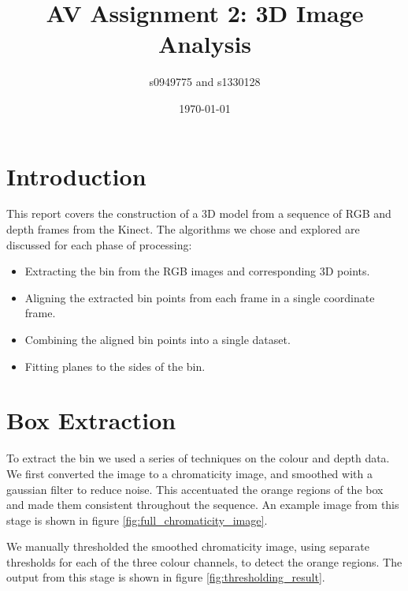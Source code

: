\documentclass[12pt,a4paper,onecolumn]{article}
\begin{document}
\title{AV Assignment 2: 3D Image Analysis}
\author{s0949775 and s1330128}
\date{\today}
\maketitle


\section{Introduction}
This report covers the construction of a 3D model from a 
sequence of RGB and depth frames from the Kinect. 
The algorithms we chose and explored are discussed for
each phase of processing:
\begin{itemize}
\item Extracting the bin from the RGB images and corresponding 3D points.
\item Aligning the extracted bin points from each frame in a single coordinate frame.
\item Combining the aligned bin points into a single dataset.
\item Fitting planes to the sides of the bin.
\end{itemize}

\section{Box Extraction}
To extract the bin we used a series of techniques on the colour and depth data.  We first converted the image to a chromaticity image, and smoothed with a gaussian filter to reduce noise.  This accentuated the orange regions of the box and made them consistent throughout the sequence.  An example image from this stage is shown in figure \ref{fig:full_chromaticity_image}.

We manually thresholded the smoothed chromaticity image, using separate thresholds for each of the three colour channels, to detect the orange regions.  The output from this stage is shown in figure \ref{fig:thresholding_result}.
\end{document}
